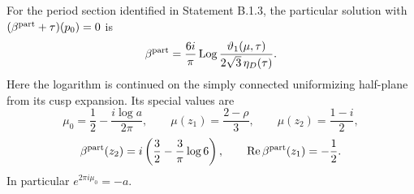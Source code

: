 \begin{proposition}\label{fam:src:C.1.1}\label{fam:st:C.1.1}
For the period section identified in Statement B.1.3, the particular solution
with \((\beta^{\rm part}+\tau)(p_0)=0\) is
\begin{equation}\label{fam:eq:cd-beta}
 \beta^{\rm part}=\frac{6i}{\pi}\operatorname{Log}
 \frac{\vartheta_1(\mu,\tau)}{2\sqrt3\,\eta_D(\tau)}.
\end{equation}
Here the logarithm is continued on the simply connected uniformizing
half-plane from its cusp expansion. Its special values are
\[
 \mu_0=\frac12-\frac{i\log a}{2\pi},\qquad
 \mu(z_1)=\frac{2-\rho}{3},\qquad \mu(z_2)=\frac{1-i}{2},
\]
\[
 \beta^{\rm part}(z_2)=i\left(\frac32-\frac3\pi\log6\right),
 \qquad \operatorname{Re}\beta^{\rm part}(z_1)=-\frac12.
\]
In particular \(e^{2\pi i\mu_0}=-a\).
\end{proposition}
